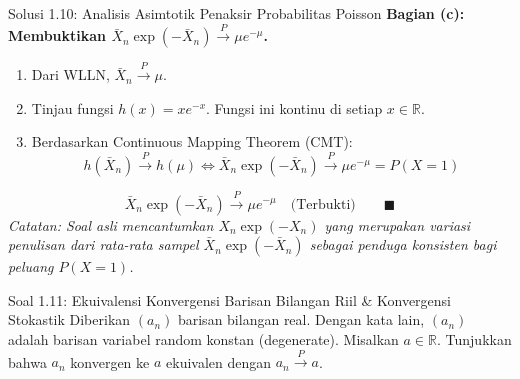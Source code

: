 \documentclass[10pt,twoside]{article}
\begin{document}
\begin{solbox}{Solusi 1.10: Analisis Asimtotik Penaksir Probabilitas Poisson}
\textbf{Bagian (c): Membuktikan $\bar{X}_n \exp(-\bar{X}_n) \xrightarrow{P} \mu e^{-\mu}$.}
\begin{enumerate}[label=\arabic*.]
  \item Dari WLLN, $\bar{X}_n \xrightarrow{P} \mu$.
  \item Tinjau fungsi $h(x) = x e^{-x}$. Fungsi ini kontinu di setiap $x \in \mathbb{R}$.
  \item Berdasarkan Continuous Mapping Theorem (CMT):
  \[
  h(\bar{X}_n) \xrightarrow{P} h(\mu) \iff \bar{X}_n \exp(-\bar{X}_n) \xrightarrow{P} \mu e^{-\mu} = P(X = 1)
  \]
\end{enumerate}
\[
\boxed{\bar{X}_n \exp(-\bar{X}_n) \xrightarrow{P} \mu e^{-\mu} \quad \text{(Terbukti)}} \qquad \blacksquare
\]
\textit{Catatan: Soal asli mencantumkan $X_n \exp(-X_n)$ yang merupakan variasi penulisan dari rata-rata sampel $\bar{X}_n \exp(-\bar{X}_n)$ sebagai penduga konsisten bagi peluang $P(X=1)$.}
\end{solbox}

\begin{soalbox}{Soal 1.11: Ekuivalensi Konvergensi Barisan Bilangan Riil \& Konvergensi Stokastik}
Diberikan $(a_n)$ barisan bilangan real. Dengan kata lain, $(a_n)$ adalah barisan variabel random konstan (degenerate). Misalkan $a \in \mathbb{R}$. Tunjukkan bahwa $a_n$ konvergen ke $a$ ekuivalen dengan $a_n \xrightarrow{P} a$.
\end{soalbox}
\end{document}
